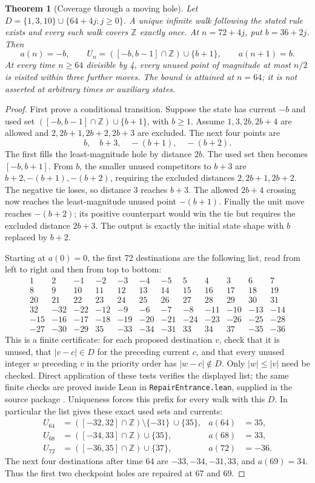 \documentclass[11pt,a4paper]{article}
\newtheorem{theorem}{Theorem}
\newcommand{\Z}{\mathbb Z}\newcommand{\N}{\mathbb N}
\newcommand{\code}[1]{\texttt{#1}}
\begin{document}
\begin{theorem}[Coverage through a moving hole]\label{thm:repair}
Let $D=\{1,3,10\}\cup\{64+4j:j\ge0\}$. A unique infinite walk following the stated rule exists
and every such walk covers $\Z$ exactly once. At $n=72+4j$, put $b=36+2j$.
Then
\[
 a(n)=-b,\qquad U_n=([-b,b-1]\cap\Z)\cup\{b+1\},
 \qquad a(n+1)=b.
\]
At every time $n\ge64$ divisible by 4, every unused point of magnitude
at most $n/2$ is visited within three further moves. The bound is attained
at $n=64$; it is not asserted at arbitrary times or auxiliary states.
\end{theorem}
\begin{proof}
First prove a conditional transition. Suppose the state has current $-b$
and used set $([-b,b-1]\cap\Z)\cup\{b+1\}$, with $b\ge1$. Assume
$1,3,2b,2b+4$ are allowed and $2,2b+1,2b+2,2b+3$ are excluded.
The next four points are
\[
 b,\quad b+3,\quad -(b+1),\quad -(b+2).
\]
The first fills the least-magnitude hole by distance $2b$. The used set
then becomes $[-b,b+1]$. From $b$, the smaller unused competitors to
$b+3$ are $b+2,-(b+1),-(b+2)$, requiring the excluded distances
$2,2b+1,2b+2$. The negative tie loses, so distance 3 reaches $b+3$.
The allowed $2b+4$ crossing now reaches the least-magnitude unused point
$-(b+1)$. Finally the unit move reaches $-(b+2)$; its positive counterpart
would win the tie but requires the excluded distance $2b+3$.
The output is exactly the initial state shape with $b$ replaced by $b+2$.

Starting at $a(0)=0$, the first 72 destinations are the following list,
read from left to right and then from top to bottom:
\[
\begin{array}{rrrrrrrrrrrr}
1&2&-1&-2&-3&-4&-5&5&4&3&6&7\\
8&9&10&11&12&13&14&15&16&17&18&19\\
20&21&22&23&24&25&26&27&28&29&30&31\\
32&-32&-22&-12&-9&-6&-7&-8&-11&-10&-13&-14\\
-15&-16&-17&-18&-19&-20&-21&-24&-23&-26&-25&-28\\
-27&-30&-29&35&-33&-34&-31&33&34&37&-35&-36
\end{array}
\]
This is a finite certificate: for each proposed destination $v$, check
that it is unused, that $|v-c|\in D$ for the preceding current $c$, and
that every unused integer $w$ preceding $v$ in the priority order has
$|w-c|\notin D$. Only $|w|\le|v|$ need be checked. Direct application of
these tests verifies the displayed list; the same finite checks are proved
inside Lean in \code{RepairEntrance.lean}, supplied in the source package
\cite{package}. Uniqueness forces this prefix for every walk with this $D$.
In particular the list gives these exact used sets and currents:
\begin{align*}
 U_{64}&=([-32,32]\cap\Z)\setminus\{-31\}\ \cup\{35\},
   &a(64)&=35,\\
 U_{68}&=([-34,33]\cap\Z)\cup\{35\},&a(68)&=33,\\
 U_{72}&=([-36,35]\cap\Z)\cup\{37\},&a(72)&=-36.
\end{align*}
The next four destinations after time 64 are $-33,-34,-31,33$, and
$a(69)=34$. Thus the first two checkpoint holes are repaired at 67 and 69.


\end{proof}
\end{document}
